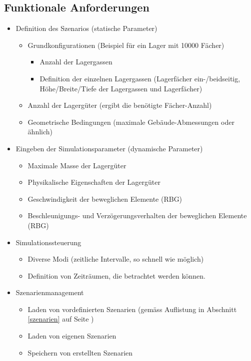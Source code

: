 \documentclass[11pt,a4paper]{article}
\begin{document}
\subsection{Funktionale Anforderungen}
\begin{itemize}
  \item Definition des Szenarios (statische Parameter)
  \begin{itemize}
    \item Grundkonfigurationen (Beispiel für ein Lager mit 10000 Fächer)
    \begin{itemize}
      \item Anzahl der Lagergassen
      \item Definition der einzelnen Lagergassen (Lagerfächer ein-/beidseitig, Höhe/Breite/Tiefe der Lagergassen und Lagerfächer)
    \end{itemize}
    
    \item Anzahl der Lagergüter (ergibt die benötigte Fächer-Anzahl)
    \item Geometrische Bedingungen (maximale Gebäude-Abmessungen oder ähnlich)
  \end{itemize}
  
  \item Eingeben der Simulationsparameter (dynamische Parameter)
    \begin{itemize}
    \item Maximale Masse der Lagergüter
    \item Physikalische Eigenschaften der Lagergüter
    \item Geschwindigkeit der beweglichen Elemente (RBG)
    \item Beschleunigungs- und Verzögerungsverhalten der beweglichen Elemente (RBG)
  \end{itemize}
  \item Simulationssteuerung
    \begin{itemize}
    \item Diverse Modi (zeitliche Intervalle, so schnell wie möglich)
    \item Definition von Zeiträumen, die betrachtet werden können.
  \end{itemize}
  \item Szenarienmanagement
    \begin{itemize}
    \item Laden von vordefinierten Szenarien (gemäss Auflistung in Abschnitt \ref{szenarien} auf Seite \pageref{szenarien})
    \item Laden von eigenen Szenarien
    \item Speichern von erstellten Szenarien
  \end{itemize}
\end{itemize}
%
\end{document}
